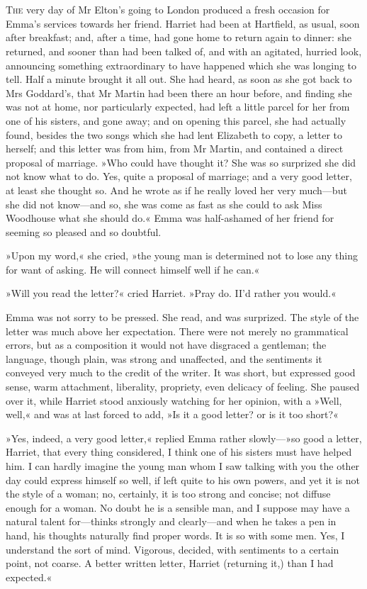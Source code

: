 \chapter[Chapter \thechapter]{}
\lettrine[lines=4,lraise=0.3]{T}{he} very day of Mr Elton's going to London produced a fresh occasion for Emma's services towards her friend. Harriet had been at Hartfield, as usual, soon after breakfast; and, after a time, had gone home to return again to dinner: she returned, and sooner than had been talked of, and with an agitated, hurried look, announcing something extraordinary to have happened which she was longing to tell. Half a minute brought it all out. She had heard, as soon as she got back to Mrs Goddard's, that Mr Martin had been there an hour before, and finding she was not at home, nor particularly expected, had left a little parcel for her from one of his sisters, and gone away; and on opening this parcel, she had actually found, besides the two songs which she had lent Elizabeth to copy, a letter to herself; and this letter was from him, from Mr Martin, and contained a direct proposal of marriage. »Who could have thought it? She was so surprized she did not know what to do. Yes, quite a proposal of marriage; and a very good letter, at least she thought so. And he wrote as if he really loved her very much—but she did not know—and so, she was come as fast as she could to ask Miss Woodhouse what she should do.\longdash« Emma was half-ashamed of her friend for seeming so pleased and so doubtful.

»Upon my word,« she cried, »the young man is determined not to lose any thing for want of asking. He will connect himself well if he can.«

»Will you read the letter?« cried Harriet. »Pray do. II'd rather you would.«

Emma was not sorry to be pressed. She read, and was surprized. The style of the letter was much above her expectation. There were not merely no grammatical errors, but as a composition it would not have disgraced a gentleman; the language, though plain, was strong and unaffected, and the sentiments it conveyed very much to the credit of the writer. It was short, but expressed good sense, warm attachment, liberality, propriety, even delicacy of feeling. She paused over it, while Harriet stood anxiously watching for her opinion, with a »Well, well,« and was at last forced to add, »Is it a good letter? or is it too short?«

»Yes, indeed, a very good letter,« replied Emma rather slowly—»so good a letter, Harriet, that every thing considered, I think one of his sisters must have helped him. I can hardly imagine the young man whom I saw talking with you the other day could express himself so well, if left quite to his own powers, and yet it is not the style of a woman; no, certainly, it is too strong and concise; not diffuse enough for a woman. No doubt he is a sensible man, and I suppose may have a natural talent for—thinks strongly and clearly—and when he takes a pen in hand, his thoughts naturally find proper words. It is so with some men. Yes, I understand the sort of mind. Vigorous, decided, with sentiments to a certain point, not coarse. A better written letter, Harriet (returning it,) than I had expected.«

